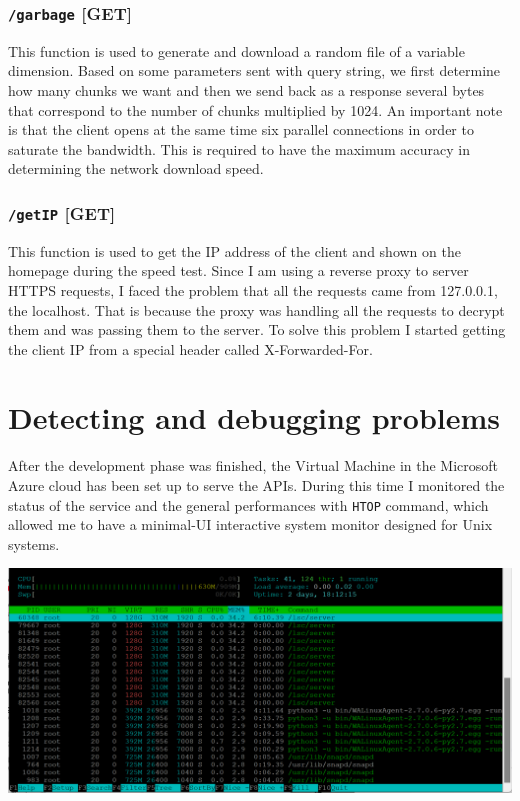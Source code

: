 \documentclass{article}
\begin{document}
\subsubsection{\texttt{/garbage} [GET]}
This function is used to generate and download a random file of a variable dimension. Based on some parameters sent with query string, we first determine how many chunks we want and then we send back as a response several bytes that correspond to the number of chunks multiplied by 1024.
An important note is that the client opens at the same time six parallel connections in order to saturate the bandwidth. This is required to have the maximum accuracy in determining the network download speed.

\subsubsection{\texttt{/getIP} [GET]}
This function is used to get the IP address of the client and shown on the homepage during the speed test.
Since I am using a reverse proxy to server HTTPS requests, I faced the problem that all the requests came from 127.0.0.1, the localhost. That is because the proxy was handling all the requests to decrypt them and was passing them to the server. To solve this problem I started getting the client IP from a special header called X-Forwarded-For.

\newpage
\section{Detecting and debugging problems}
After the development phase was finished, the Virtual Machine in the Microsoft Azure cloud has been set up to serve the APIs. During this time I monitored the status of the service and the general performances with \texttt{HTOP} command, which allowed me to have a minimal-UI interactive system monitor designed for Unix systems.

\begin{center}
\begin{minipage}{12cm}
\includegraphics[width=\textwidth]{10-meml-1}
\end{minipage}
\end{center}
\end{document}
